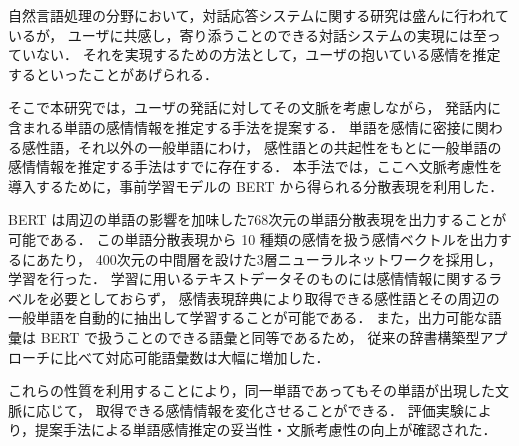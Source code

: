 \abstract
自然言語処理の分野において，対話応答システムに関する研究は盛んに行われているが，
ユーザに共感し，寄り添うことのできる対話システムの実現には至っていない．
それを実現するための方法として，ユーザの抱いている感情を推定するといったことがあげられる．

そこで本研究では，ユーザの発話に対してその文脈を考慮しながら，
発話内に含まれる単語の感情情報を推定する手法を提案する．
単語を感情に密接に関わる感性語，それ以外の一般単語にわけ，
感性語との共起性をもとに一般単語の感情情報を推定する手法はすでに存在する．
本手法では，ここへ文脈考慮性を導入するために，事前学習モデルの BERT から得られる分散表現を利用した．

BERT は周辺の単語の影響を加味した768次元の単語分散表現を出力することが可能である．
この単語分散表現から 10 種類の感情を扱う感情ベクトルを出力するにあたり，
400次元の中間層を設けた3層ニューラルネットワークを採用し，学習を行った．
学習に用いるテキストデータそのものには感情情報に関するラベルを必要としておらず，
感情表現辞典により取得できる感性語とその周辺の一般単語を自動的に抽出して学習することが可能である．
また，出力可能な語彙は BERT で扱うことのできる語彙と同等であるため，
従来の辞書構築型アプローチに比べて対応可能語彙数は大幅に増加した．

これらの性質を利用することにより，同一単語であってもその単語が出現した文脈に応じて，
取得できる感情情報を変化させることができる．
評価実験により，提案手法による単語感情推定の妥当性・文脈考慮性の向上が確認された．


